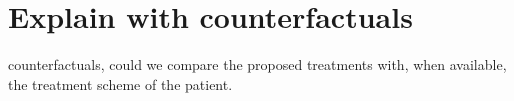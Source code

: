 \documentclass[../main.tex]{subfiles}
\begin{document}
\chapter{Explain with counterfactuals}\label{chap:counterfactuals}
\graphicspath{{./figures/6-Interpretability}}
\minitocpage

counterfactuals, could we compare the proposed treatments with, when available, the treatment scheme of the patient.
\end{document}
